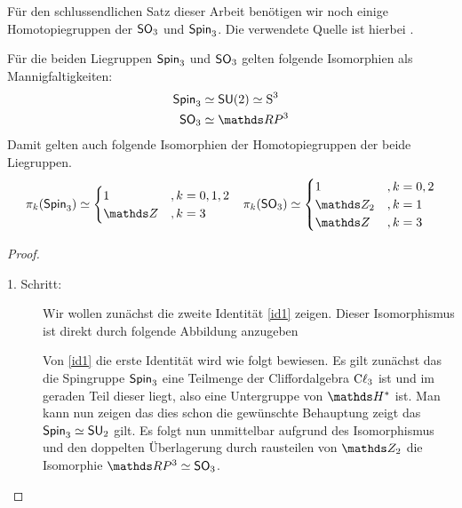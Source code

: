 Für den schlussendlichen Satz dieser Arbeit benötigen wir noch einige
Homotopiegruppen der $\operatorname{\mathsf{SO}}_3$ und $\operatorname{\mathsf{Spin}}_3$. Die verwendete Quelle ist
hierbei \cite{BHMMM15}.
\begin{Lem}\label{hgroups}
	Für die beiden Liegruppen $\operatorname{\mathsf{Spin}}_3$ und $\operatorname{\mathsf{SO}}_3$ gelten
	folgende Isomorphien als Mannigfaltigkeiten:
	\begin{align}
	\spin_3 &\simeq \su(2) \simeq \S^3 \label{id1}\\
	\so_3 &\simeq \RP^3 \label{id2}
	\end{align}
	Damit gelten auch folgende Isomorphien der Homotopiegruppen
	der beide Liegruppen.
	\begin{align*}
	\pi_k(\spin_3) &\simeq \begin{cases}
	1 & ,k=0,1,2 \\
	\Z & ,k=3
	\end{cases}
	&{\pi_k(\so_3) \simeq \begin{cases}
		1 & ,k=0,2 \\
		\Z_2 & ,k=1 \\
		\Z & ,k=3
		\end{cases}}
	\end{align*}
	
	\begin{proof}
		\begin{description}
                \item[1. Schritt:] Wir wollen zunächst die zweite
                  Identität \cref{id1} zeigen. Dieser Isomorphismus
                  ist direkt durch folgende Abbildung anzugeben
			
                  Von \cref{id1} die erste Identität wird wie folgt
                  bewiesen.  Es gilt zunächst das die Spingruppe
                  $ \operatorname{\mathsf{Spin}}_3 $ eine Teilmenge der Cliffordalgebra
                  $ \operatorname{C\ell}_3 $ ist und im geraden Teil dieser liegt, also
                  eine Untergruppe von $ \H^\ast $ ist. Man kann nun
                  zeigen das dies schon die gewünschte Behauptung
                  zeigt das $ \operatorname{\mathsf{Spin}}_3 \simeq \operatorname{\mathsf{SU}}_2 $ gilt.
				  Es folgt nun unmittelbar aufgrund des Isomorphismus
				  und den doppelten Überlagerung durch rausteilen
				  von $ \Z_2 $ die Isomorphie $ \RP^3\simeq\so_3 $.
			

\end{description}
\end{proof}
\end{Lem}
